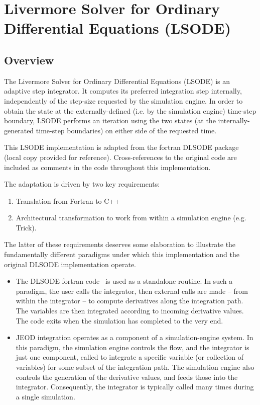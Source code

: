\chapter{Livermore Solver for Ordinary Differential Equations (LSODE)}
\label{app:lsode}

\section{Overview}

The Livermore Solver for Ordinary Differential Equations (LSODE) is an
adaptive step integrator.  It computes its preferred integration step
internally, independently of the step-size requested by
the simulation engine.  In order to obtain the state at the externally-defined
(i.e. by the simulation engine) time-step boundary, LSODE performs an
iteration using the two states (at the internally-generated time-step
boundaries) on either side of the requested time.

This LSODE
implementation is adapted from the fortran DLSODE
package~\cite{code:dlsode} (local copy provided for reference).
Cross-references to
the original code are included as comments in the code throughout this
implementation.

The adaptation is driven by two key requirements:
\begin{enumerate}
\item
Translation from Fortran to C++
\item
Architectural transformation to work from within a simulation engine (e.g.
Trick).
\end{enumerate}

The latter of these requirements deserves some elaboration to illustrate
the fundamentally different paradigms under which this implementation and the
original DLSODE implementation operate.
\begin{itemize}
\item The DLSODE fortran code~\cite{code:dlsode}
is used as a standalone routine.
In such a paradigm, the user calls the integrator, then
external calls are made
-- from within the integrator --
to compute
derivatives along the integration path.
The variables are then integrated
according to incoming derivative values.
The code exits when the simulation
has completed to the very end.
\item JEOD integration operates as a component of a simulation-engine
system.  In this paradigm, the simulation engine controls the flow, and the
integrator is just one component, called to integrate a specific variable
(or collection of
variables) for some subset of the integration path.  The simulation engine
also controls the generation of the derivative values, and feeds those
into the integrator.  Consequently, the
integrator is typically called many times during a single simulation.
\end{itemize}

